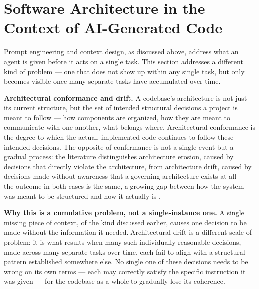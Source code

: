 \section{Software Architecture in the Context of AI-Generated Code}

Prompt engineering and context design, as discussed above, address what an agent is given before it acts on a single task. This section addresses a different kind of problem --- one that does not show up within any single task, but only becomes visible once many separate tasks have accumulated over time.

\textbf{Architectural conformance and drift.} A codebase's architecture is not just its current structure, but the set of intended structural decisions a project is meant to follow --- how components are organized, how they are meant to communicate with one another, what belongs where. Architectural conformance is the degree to which the actual, implemented code continues to follow these intended decisions. The opposite of conformance is not a single event but a gradual process: the literature distinguishes architecture erosion, caused by decisions that directly violate the architecture, from architecture drift, caused by decisions made without awareness that a governing architecture exists at all --- the outcome in both cases is the same, a growing gap between how the system was meant to be structured and how it actually is \cite{perry1992foundations}.

\textbf{Why this is a cumulative problem, not a single-instance one.} A single missing piece of context, of the kind discussed earlier, causes one decision to be made without the information it needed. Architectural drift is a different scale of problem: it is what results when many such individually reasonable decisions, made across many separate tasks over time, each fail to align with a structural pattern established somewhere else. No single one of these decisions needs to be wrong on its own terms --- each may correctly satisfy the specific instruction it was given --- for the codebase as a whole to gradually lose its coherence.

